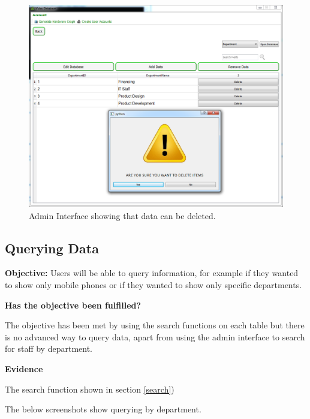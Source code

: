 \begin{figure}[H]
    \includegraphics[width=\textwidth]{./Evaluation/Images/admin3.png}
    \caption{Admin Interface showing that data can be deleted.} 
\end{figure}



\subsection{Querying Data}

\textbf{Objective:} Users will be able to query information, for example if they wanted to show only mobile phones or if they wanted to show only specific departments.

\textbf{Has the objective been fulfilled?}

The objective has been met by using the search functions on each table but there is no advanced way to query data, apart from using the admin interface to search for staff by department. 

\textbf{Evidence}

The search function shown in section \ref{search})

The below screenshots show querying by department.

